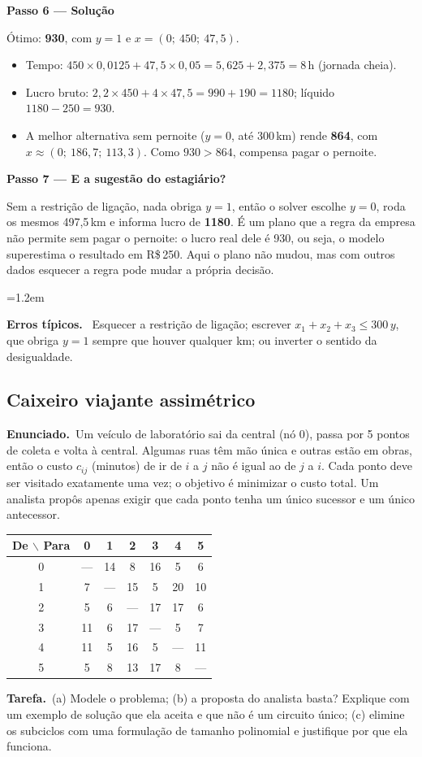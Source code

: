 \documentclass[11pt,a4paper]{article}
\newcommand{\enunciado}{\par\textbf{Enunciado.}\ }
\newcommand{\tarefa}{\par\textbf{Tarefa.}\ }
\newcommand{\passo}[1]{\par\medskip\textbf{#1}\par}
\newenvironment{nota}[1]{\par\smallskip\begin{list}{}{\leftmargin=1.2em\rightmargin=0pt}\item[]\textbf{#1.}\ }{\end{list}}
\begin{document}
\passo{Passo 6 --- Solução}
Ótimo: \textbf{930}, com $y=1$ e $x=(0;\ 450;\ 47{,}5)$.
\begin{itemize}
  \item Tempo: $450\times0{,}0125 + 47{,}5\times0{,}05 = 5{,}625 + 2{,}375 = 8$\,h (jornada cheia).
  \item Lucro bruto: $2{,}2\times450 + 4\times47{,}5 = 990 + 190 = 1180$; líquido $1180-250=930$.
  \item A melhor alternativa sem pernoite ($y=0$, até 300\,km) rende \textbf{864}, com
        $x\approx(0;\ 186{,}7;\ 113{,}3)$. Como $930>864$, compensa pagar o pernoite.
\end{itemize}

\passo{Passo 7 --- E a sugestão do estagiário?}
Sem a restrição de ligação, nada obriga $y=1$, então o solver escolhe $y=0$, roda os mesmos 497,5\,km e
informa lucro de \textbf{1180}. É um plano que a regra da empresa não permite sem pagar o pernoite: o
lucro real dele é 930, ou seja, o modelo superestima o resultado em R\$\,250. Aqui o plano não mudou,
mas com outros dados esquecer a regra pode mudar a própria decisão.

\begin{nota}{Erros típicos}
Esquecer a restrição de ligação; escrever $x_1+x_2+x_3\le300\,y$, que obriga $y=1$ sempre que houver
qualquer km; ou inverter o sentido da desigualdade.
\end{nota}

\subsection{Caixeiro viajante assimétrico}
\enunciado Um veículo de laboratório sai da central (nó 0), passa por 5 pontos de coleta e volta à central.
Algumas ruas têm mão única e outras estão em obras, então o custo $c_{ij}$ (minutos) de ir de $i$ a $j$ não é
igual ao de $j$ a $i$. Cada ponto deve ser visitado exatamente uma vez; o objetivo é minimizar o custo total.
Um analista propôs apenas exigir que cada ponto tenha um único sucessor e um único antecessor.
\begin{center}
\begin{tabular}{c|cccccc}
\toprule
De $\backslash$ Para & 0 & 1 & 2 & 3 & 4 & 5\\
\midrule
0 & --- & 14 & 8 & 16 & 5 & 6\\
1 & 7 & --- & 15 & 5 & 20 & 10\\
2 & 5 & 6 & --- & 17 & 17 & 6\\
3 & 11 & 6 & 17 & --- & 5 & 7\\
4 & 11 & 5 & 16 & 5 & --- & 11\\
5 & 5 & 8 & 13 & 17 & 8 & ---\\
\bottomrule
\end{tabular}
\end{center}
\tarefa (a) Modele o problema; (b) a proposta do analista basta? Explique com um exemplo de solução que
ela aceita e que não é um circuito único; (c) elimine os subciclos com uma formulação de tamanho polinomial
e justifique por que ela funciona.
\end{document}
